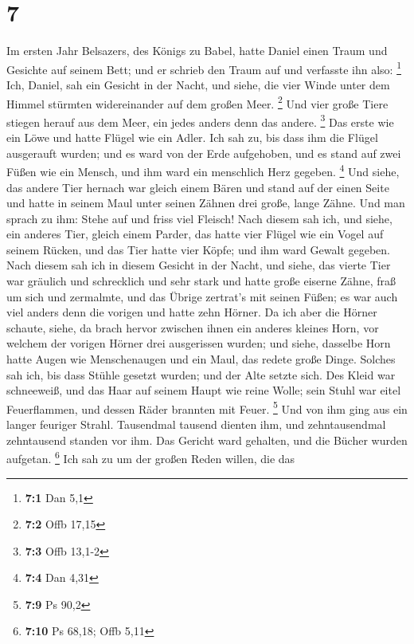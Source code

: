 \hypertarget{section-6}{%
\section{7}\label{section-6}}

 Im ersten Jahr Belsazers, des Königs zu Babel, hatte
Daniel einen Traum und Gesichte auf seinem Bett; und er schrieb den
Traum auf und verfasste ihn also: \footnote{\textbf{7:1} Dan 5,1}
 Ich, Daniel, sah ein Gesicht in der Nacht, und siehe, die
vier Winde unter dem Himmel stürmten widereinander auf dem großen Meer.
\footnote{\textbf{7:2} Offb 17,15}  Und vier große Tiere
stiegen herauf aus dem Meer, ein jedes anders denn das andere.
\footnote{\textbf{7:3} Offb 13,1-2}  Das erste wie ein
Löwe und hatte Flügel wie ein Adler. Ich sah zu, bis dass ihm die Flügel
ausgerauft wurden; und es ward von der Erde aufgehoben, und es stand auf
zwei Füßen wie ein Mensch, und ihm ward ein menschlich Herz gegeben.
\footnote{\textbf{7:4} Dan 4,31}  Und siehe, das andere
Tier hernach war gleich einem Bären und stand auf der einen Seite und
hatte in seinem Maul unter seinen Zähnen drei große, lange Zähne. Und
man sprach zu ihm: Stehe auf und friss viel Fleisch!  Nach
diesem sah ich, und siehe, ein anderes Tier, gleich einem Parder, das
hatte vier Flügel wie ein Vogel auf seinem Rücken, und das Tier hatte
vier Köpfe; und ihm ward Gewalt gegeben.  Nach diesem sah
ich in diesem Gesicht in der Nacht, und siehe, das vierte Tier war
gräulich und schrecklich und sehr stark und hatte große eiserne Zähne,
fraß um sich und zermalmte, und das Übrige zertrat's mit seinen Füßen;
es war auch viel anders denn die vorigen und hatte zehn Hörner.
 Da ich aber die Hörner schaute, siehe, da brach hervor
zwischen ihnen ein anderes kleines Horn, vor welchem der vorigen Hörner
drei ausgerissen wurden; und siehe, dasselbe Horn hatte Augen wie
Menschenaugen und ein Maul, das redete große Dinge. 
Solches sah ich, bis dass Stühle gesetzt wurden; und der Alte setzte
sich. Des Kleid war schneeweiß, und das Haar auf seinem Haupt wie reine
Wolle; sein Stuhl war eitel Feuerflammen, und dessen Räder brannten mit
Feuer. \footnote{\textbf{7:9} Ps 90,2}  Und von ihm ging
aus ein langer feuriger Strahl. Tausendmal tausend dienten ihm, und
zehntausendmal zehntausend standen vor ihm. Das Gericht ward gehalten,
und die Bücher wurden aufgetan. \footnote{\textbf{7:10} Ps 68,18; Offb
  5,11}  Ich sah zu um der großen Reden willen, die das

